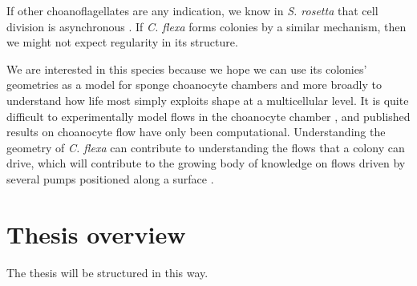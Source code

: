 If other choanoflagellates are any indication, we know in \textit{S. rosetta} that cell division is asynchronous \citep{fairclough2010}. If \textit{C. flexa} forms colonies by a similar mechanism, then we might not expect regularity in its structure. 

We are interested in this species because we hope we can use its colonies' geometries as a model for sponge choanocyte chambers and more broadly to understand how life most simply exploits shape at a multicellular level. It is quite difficult to experimentally model flows in the choanocyte chamber \citep{todo}, and published results on choanocyte flow have only been computational. Understanding the geometry of \textit{C. flexa} can contribute to understanding the flows that a colony can drive, which will contribute to the growing body of knowledge on flows driven by several pumps positioned along a surface \citep{asadzadeh2019}.

\section{Thesis overview}

The thesis will be structured in this way.
